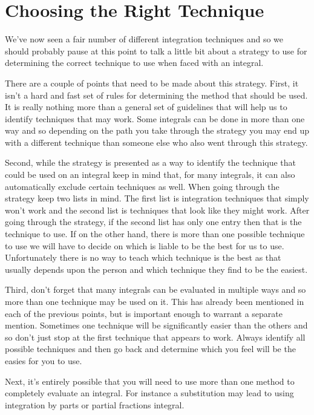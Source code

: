 \section{Choosing the Right Technique}

We've now seen a fair number of different integration techniques and so we should probably pause at this point to talk a little bit about a strategy to use for determining the correct technique to use when faced with an integral.

There are a couple of points that need to be made about this strategy. First, it isn't a hard and fast set of rules for determining the method that should be used. It is really nothing more than a general set of guidelines that will help us to identify techniques that may work. Some integrals can be done in more than one way and so depending on the path you take through the strategy you may end up with a different technique than someone else who also went through this strategy.

Second, while the strategy is presented as a way to identify the technique that could be used on an integral keep in mind that, for many integrals, it can also automatically exclude certain techniques as well. When going through the strategy keep two lists in mind. The first list is integration techniques that simply won't work and the second list is techniques that look like they might work. After going through the strategy, if the second list has only one entry then that is the technique to use. If on the other hand, there is more than one possible technique to use we will have to decide on which is liable to be the best for us to use. Unfortunately there is no way to teach which technique is the best as that usually depends upon the person and which technique they find to be the easiest.

Third, don't forget that many integrals can be evaluated in multiple ways and so more than one technique may be used on it. This has already been mentioned in each of the previous points, but is important enough to warrant a separate mention. Sometimes one technique will be significantly easier than the others and so don't just stop at the first technique that appears to work. Always identify all possible techniques and then go back and determine which you feel will be the easies for you to use.

Next, it's entirely possible that you will need to use more than one method to completely evaluate an integral. For instance a substitution may lead to using integration by parts or partial fractions integral.

